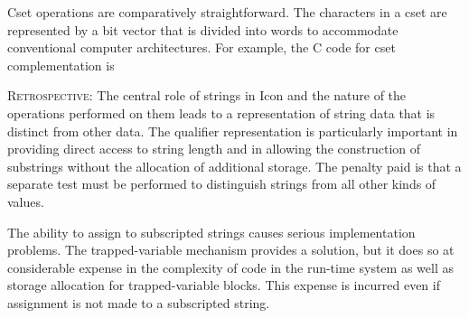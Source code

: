Cset operations are comparatively straightforward. The characters in a
cset are represented by a bit vector that is divided into words to
accommodate conventional computer architectures. For example, the C
code for cset complementation is

\goodbreak
{}

\textsc{Retrospective}: The central role of strings in Icon and the
nature of the operations performed on them leads to a representation
of string data that is distinct from other data. The qualifier
representation is particularly important in providing direct access to
string length and in allowing the construction of substrings without
the allocation of additional storage. The penalty paid is that a
separate test must be performed to distinguish strings from all other
kinds of values.

The ability to assign to subscripted strings causes serious
implementation problems. The trapped-variable mechanism provides a
solution, but it does so at considerable expense in the complexity of
code in the run-time system as well as storage allocation for
trapped-variable blocks. This expense is incurred even if assignment
is not made to a subscripted string.

